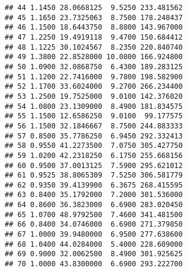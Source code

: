 \documentclass[
]{article}
\newenvironment{Shaded}{\begin{snugshade}}{\end{snugshade}}
\newcommand{\AttributeTok}[1]{\textcolor[rgb]{0.77,0.63,0.00}{#1}}
\newcommand{\FunctionTok}[1]{\textcolor[rgb]{0.00,0.00,0.00}{#1}}
\newcommand{\NormalTok}[1]{#1}
\newcommand{\OtherTok}[1]{\textcolor[rgb]{0.56,0.35,0.01}{#1}}
\newcommand{\SpecialCharTok}[1]{\textcolor[rgb]{0.00,0.00,0.00}{#1}}
\newcommand{\StringTok}[1]{\textcolor[rgb]{0.31,0.60,0.02}{#1}}
\begin{document}
\begin{verbatim}
## 44 1.1450 28.0668125  9.5250 233.481562
## 45 1.1650 23.7325063  8.7500 178.248437
## 46 1.1500 18.6443750  8.8800 143.967000
## 47 1.2250 19.4919118  9.4700 150.684412
## 48 1.1225 30.1024567  8.2350 220.840740
## 49 1.3800 22.8528000 10.0800 166.924800
## 50 1.0900 32.0868750  6.4300 189.283125
## 51 1.1200 22.7416000  9.7800 198.582900
## 52 1.1700 33.6024000  9.2700 266.234400
## 53 1.2500 19.7525000  9.0100 142.376020
## 54 1.0800 23.1309000  8.4900 181.834575
## 55 1.1500 12.6586250  9.0100  99.177575
## 56 1.1500 32.1846667  8.7500 244.883333
## 57 0.8500 35.7786250  6.9450 292.332413
## 58 0.9550 41.2273500  7.0750 305.427750
## 59 1.0200 42.2318250  6.1750 255.668156
## 60 0.9500 37.0013125  7.5900 295.621012
## 61 0.9525 38.8065309  7.5250 306.581779
## 62 0.9350 39.4139900  6.3675 268.415595
## 63 0.8400 35.1792000  7.2000 301.536000
## 64 0.8600 36.3823000  6.6900 283.020450
## 65 1.0700 48.9792500  7.4600 341.481500
## 66 0.8400 34.0746000  6.6900 271.379850
## 67 1.0000 39.9480000  6.9500 277.638600
## 68 1.0400 44.0284000  5.4000 228.609000
## 69 0.9000 32.0062500  8.4900 301.925625
## 70 1.0000 43.8300000  6.6900 293.222700
\end{verbatim}

\begin{Shaded}
\end{Shaded}
\end{document}
